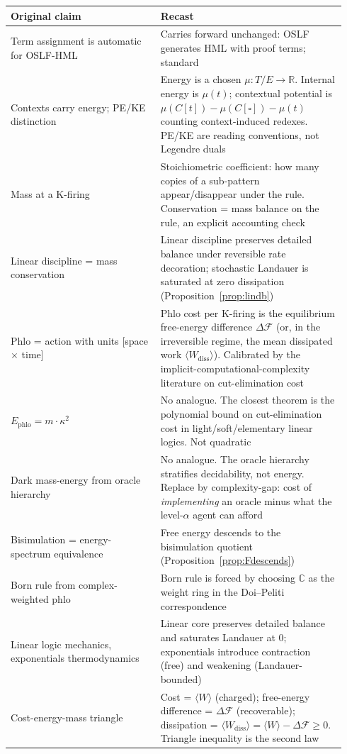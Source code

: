 \documentclass[11pt]{article}
\theoremstyle{plain}
\theoremstyle{definition}
\theoremstyle{remark}
\newcommand{\R}{\mathbb{R}}
\newcommand{\C}{\mathbb{C}}
\newcommand{\F}{\mathcal{F}}
\begin{document}
\begin{center}
\begin{tabular}{p{0.42\linewidth}p{0.52\linewidth}}
\toprule
\textbf{Original claim} & \textbf{Recast} \\
\midrule
Term assignment is automatic for OSLF-HML & Carries forward unchanged: OSLF generates HML with proof terms; standard \\
Contexts carry energy; PE/KE distinction & Energy is a chosen $\mu : T/E \to \R$. Internal energy is $\mu(t)$; contextual potential is $\mu(C[t]) - \mu(C[\square]) - \mu(t)$ counting context-induced redexes. PE/KE are reading conventions, not Legendre duals \\
Mass at a K-firing & Stoichiometric coefficient: how many copies of a sub-pattern appear/disappear under the rule. Conservation = mass balance on the rule, an explicit accounting check \\
Linear discipline = mass conservation & Linear discipline preserves detailed balance under reversible rate decoration; stochastic Landauer is saturated at zero dissipation (Proposition~\ref{prop:lindb}) \\
Phlo = action with units [space $\times$ time] & Phlo cost per K-firing is the equilibrium free-energy difference $\Delta \F$ (or, in the irreversible regime, the mean dissipated work $\langle W_{\mathrm{diss}}\rangle$). Calibrated by the implicit-computational-complexity literature on cut-elimination cost \\
$E_{\mathrm{phlo}} = m \cdot \kappa^2$ & No analogue. The closest theorem is the polynomial bound on cut-elimination cost in light/soft/elementary linear logics. Not quadratic \\
Dark mass-energy from oracle hierarchy & No analogue. The oracle hierarchy stratifies decidability, not energy. Replace by complexity-gap: cost of \emph{implementing} an oracle minus what the level-$\alpha$ agent can afford \\
Bisimulation = energy-spectrum equivalence & Free energy descends to the bisimulation quotient (Proposition~\ref{prop:Fdescends}) \\
Born rule from complex-weighted phlo & Born rule is forced by choosing $\C$ as the weight ring in the Doi--Peliti correspondence \\
Linear logic mechanics, exponentials thermodynamics & Linear core preserves detailed balance and saturates Landauer at 0; exponentials introduce contraction (free) and weakening (Landauer-bounded) \\
Cost-energy-mass triangle & Cost = $\langle W \rangle$ (charged); free-energy difference = $\Delta \F$ (recoverable); dissipation = $\langle W_{\mathrm{diss}} \rangle = \langle W \rangle - \Delta \F \geq 0$. Triangle inequality is the second law \\
\bottomrule
\end{tabular}
\end{center}
\end{document}
